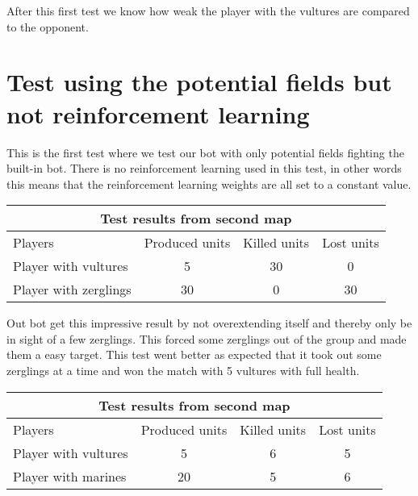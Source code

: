 After this first test we know how weak the player with the vultures are compared to the opponent.
\newpage
\section{Test using the potential fields but not reinforcement learning} %
This is the first test where we test our bot with only potential fields fighting the built-in bot. There is no reinforcement learning used in this test, in other words this means that the reinforcement learning weights are all set to a constant value.\\

\begin{centering}
 \begin{tabular}{|l|c|c|c|}
	\multicolumn{4}{c}{Test results from second map} \\
	\hline
	Players & Produced units & Killed units & Lost units\\
	\hline
	\hline
		Player with vultures & 5 & 30 & 0\\
	\hline
		Player with zerglings & 30 & 0 & 30\\
	\hline

\end{tabular}
\end{centering}

Out bot get this impressive result by not overextending itself and thereby only be in sight of a few zerglings. This forced some zerglings out of the group and made them a easy target. This test went better as expected that it took out some zerglings at a time and won the match with 5 vultures with full health.\\

\begin{centering}
 \begin{tabular}{|l|c|c|c|}
	\multicolumn{4}{c}{Test results from second map} \\
	\hline
	Players & Produced units & Killed units & Lost units\\
	\hline
	\hline
		Player with vultures & 5 & 6 & 5\\
	\hline
		Player with marines & 20 & 5 & 6\\
	\hline

\end{tabular}
\end{centering}



